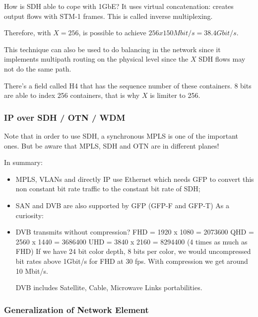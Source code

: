 How is SDH able to cope with 1GbE?
It uses virtual concatenation: creates  output flows with STM-1 frames. 
This is called inverse multiplexing.


Therefore, with $X = 256$, is possible to achieve $256 x 150 Mbit/s = 38.4 Gbit/s$.


This technique can also be used to do balancing in the network since it implements multipath routing on the physical level since the $X$ SDH flows may not do the same path.

There's a field called H4 that has the sequence number of these containers.
8 bits are able to index 256 containers, that is why $X$ is limiter to 256.



\subsubsection*{IP over SDH / OTN / WDM}

Note that in order to use SDH, a synchronous 
MPLS is one of the important ones. But be aware that MPLS, SDH and OTN are in different planes!



In summary:
\begin{itemize}
    \item MPLS,  VLANs and directly IP use Ethernet which needs GFP to convert this non constant bit rate traffic to the constant bit rate of SDH; 
    \item SAN and DVB are also supported by GFP (GFP-F and GFP-T)
    As a curiosity:
    \item DVB transmits without compression?
    FHD = 1920 x 1080 = 2073600
    QHD = 2560 x 1440 = 3686400
    UHD = 3840 x 2160 = 8294400 (4 times as much as FHD)
    If we have 24 bit color depth, 8 bits per color, we would uncompressed bit rates above 1Gbit/s for FHD at 30 fps. With compression we get around 10 Mbit/s.


    DVB includes Satellite, Cable, Microwave Links portabilities.
\end{itemize}





\subsubsection*{Generalization of Network Element}

